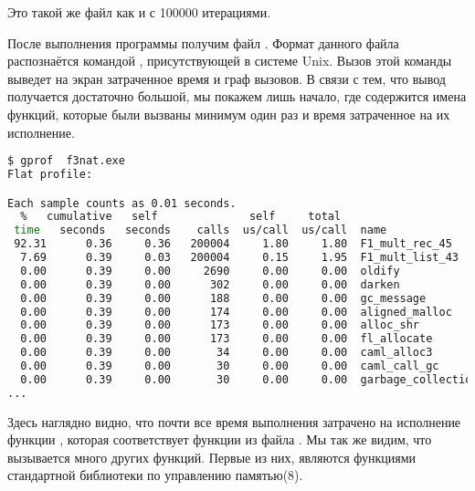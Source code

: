 Это такой же файл как и  с 100000 итерациями. 

После выполнения программы получим файл . Формат данного файла 
распознаётся командой , присутствующей в системе Unix. Вызов этой 
команды выведет на экран затраченное время и граф вызовов. В связи с тем, что 
вывод получается достаточно большой, мы покажем лишь начало, где содержится 
имена функций, которые были вызваны минимум один раз и время затраченное на их 
исполнение.

\begin{lstlisting}[language=Bash]
$ gprof  f3nat.exe 
Flat profile:

Each sample counts as 0.01 seconds.
  %   cumulative   self              self     total
 time   seconds   seconds    calls  us/call  us/call  name
 92.31      0.36     0.36   200004     1.80     1.80  F1_mult_rec_45
  7.69      0.39     0.03   200004     0.15     1.95  F1_mult_list_43
  0.00      0.39     0.00     2690     0.00     0.00  oldify
  0.00      0.39     0.00      302     0.00     0.00  darken
  0.00      0.39     0.00      188     0.00     0.00  gc_message
  0.00      0.39     0.00      174     0.00     0.00  aligned_malloc
  0.00      0.39     0.00      173     0.00     0.00  alloc_shr
  0.00      0.39     0.00      173     0.00     0.00  fl_allocate
  0.00      0.39     0.00       34     0.00     0.00  caml_alloc3
  0.00      0.39     0.00       30     0.00     0.00  caml_call_gc
  0.00      0.39     0.00       30     0.00     0.00  garbage_collection
...
\end{lstlisting}

Здесь наглядно видно, что почти все время выполнения затрачено на исполнение 
функции , которая соответствует функции 
 из файла . Мы так же видим, что вызывается 
много других функций. Первые из них, являются функциями стандартной библиотеки 
по управлению памятью(8).



